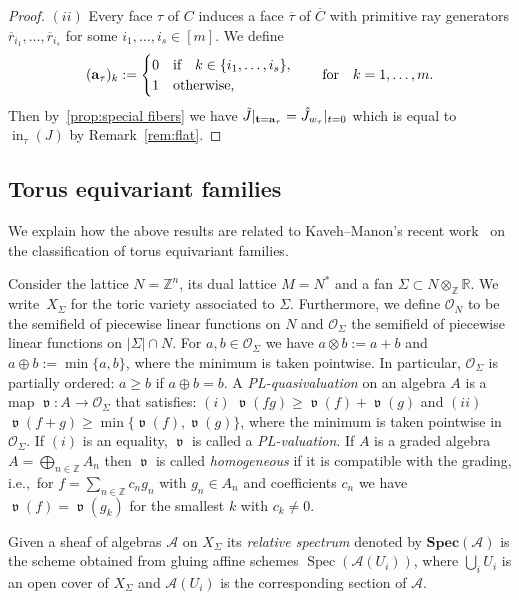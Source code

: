 \documentclass[10pt,a4paper]{amsart}
\newcommand{\thref}[1]{\ref{#1}}
\numberwithin{equation}{section}
\DeclareMathOperator{\init}{in}
\DeclareMathOperator{\val}{\mathfrak v}
\begin{document}
\begin{proof}
$(ii)$ Every face $\tau$ of $C$ induces a face $\overline{\tau}$ of $\overline{C}$ with primitive ray generators $\overline{r}_{i_1},\dots, \overline{r}_{i_{s}}$ for some $i_1,\dots,i_s\in [m]$.
 We define
 \begin{equation*}%
 ({\bf a}_{\tau})_k:=
 \begin{cases}
 0 & \text{if}\quad k\in\{i_1,\dots,i_{s}\},\\
 1 & \text{otherwise},
 \end{cases}
 \qquad
\text{for}
\quad k=1,\ldots,m.
 \end{equation*}
 Then by~\thref{prop:special fibers} we have $\tilde J\vert_{{\bf t}={\bf a}_\tau}=\hat J_{w_\tau}\vert_{t=0}$ which is equal to $\init_{\tau}(J)$ by Remark~\ref{rem:flat}.
\end{proof}


\subsection{Torus equivariant families}\label{sec:toric families}

We explain how the above results are related to Kaveh--Manon's recent work~\cite{KM-toricbundles} on the classification of torus equivariant families.

Consider the lattice $N=\mathbb Z^n$, its dual lattice $M=N^*$ and a fan $\Sigma\subset N\otimes_{\mathbb Z}\mathbb R$.
We write~$X_\Sigma$ for the toric variety associated to $\Sigma$.
Furthermore, we define $\mathcal O_N$ to be the semifield of piecewise linear functions on $N$ and $\mathcal O_{\Sigma}$ the semifield of piecewise linear functions on $\vert\Sigma\vert\cap N$.
For $a,b\in\mathcal O_{\Sigma}$ we have $a\otimes b:=a+b$ and $a\oplus b:=\min\{a,b\}$, where the minimum is taken pointwise.
In particular, $\mathcal O_{\Sigma}$ is partially ordered: $a\ge b$ if $a\oplus b=b$.
A {\it PL-quasivaluation} on an algebra $A$ is a map $\val\colon A\to \mathcal O_{\Sigma}$ that satisfies: $(i)$ $\val(fg)\ge \val(f)+\val(g)$ and $(ii)$ $\val(f+g)\ge \min\{\val(f),\val(g)\}$, where the minimum is taken pointwise in $\mathcal O_{\Sigma}$.
If $(i)$ is an equality, $\val$ is called a {\it PL-valuation}.
If $A$ is a graded algebra $A=\bigoplus_{n\in \mathbb Z} A_n$ then $\val$ is called {\it homogeneous} if it is compatible with the grading, i.e.,~for $f=\sum_{n\in \mathbb Z} c_n g_n$ with $g_n\in A_n$ and coefficients $c_n$ we have $\val(f)=\val(g_k)$ for the smallest $k$ with $c_k\not =0$.

Given a sheaf of algebras $\mathcal A$ on $X_\Sigma$ its {\it relative spectrum} denoted by $\mathbf{Spec}(\mathcal A)$ is the scheme obtained from gluing affine schemes $\operatorname{Spec}(\mathcal A(U_i))$, where $\bigcup_i U_i$ is an open cover of $X_\Sigma$ and $\mathcal A(U_i)$ is the corresponding section of $\mathcal A$.
\end{document}
